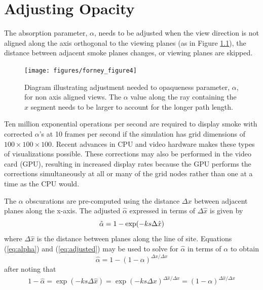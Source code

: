 \documentclass[11pt,twoside]{book}
\newcommand{\figoptions}{htp}
\begin{document}
%
%

\chapter{Adjusting Opacity}

The absorption parameter, $\alpha$, needs to be adjusted when the
view direction is not aligned along the axis orthogonal to the
viewing planes (as in Figure \ref{figray}), the distance between
adjacent smoke planes changes, or viewing planes are skipped.
\begin{figure}[\figoptions]
\centerline{\texttt{[image: figures/forney\_figure4]}}
\caption [Diagram illustrating the adjustment needed to opaqueness
parameter, $\alpha$, for non axis aligned views.] { Diagram
illustrating adjustment needed to opaqueness parameter, $\alpha$,
for non axis aligned views. The $\alpha$ value along the ray
containing the $\hat{x}$ segment needs to be larger to account for
the longer path length. } \label{figray}
\end{figure}

Ten million exponential operations per second are required to
display smoke with corrected $\alpha$'s at 10 frames per second if
the simulation has grid dimensions of $100\times 100\times 100$.
Recent advances in CPU and video hardware makes these types of
visualizations possible. These corrections may also be performed
in the video card (GPU), resulting in increased display rates
because the GPU performs the corrections simultaneously at all or
many of the grid nodes rather than one at a time as the CPU would.

The $\alpha$ obscurations are pre-computed using the distance
$\Delta x$ between adjacent planes along the x-axis. The adjusted
$\hat{\alpha}$ expressed in terms of $\Delta\hat{x}$ is given by
\begin{equation}
\label{eq:adjusted}
\hat{\alpha}=1-\exp(-ks\Delta \hat{x})\\
\end{equation}
where $\Delta\hat{x}$ is the distance between planes along the line of site.
Equations (\ref{eq:alpha}) and (\ref{eq:adjusted}) may be used to
solve for $\hat{\alpha}$ in terms of $\alpha$ to obtain
\begin{equation}
\label{eq:alphahat}
\hat{\alpha}=1-(1-\alpha)^{\Delta\hat{x}/\Delta x}
\end{equation}
after noting that
\begin{eqnarray*}
1-\hat{\alpha}=\exp(-ks\Delta\hat{x})=\exp(-ks\Delta
x)^{\Delta\hat{x}/\Delta x}=(1-\alpha)^{\Delta\hat{x}/\Delta x}
\end{eqnarray*}
\end{document}
